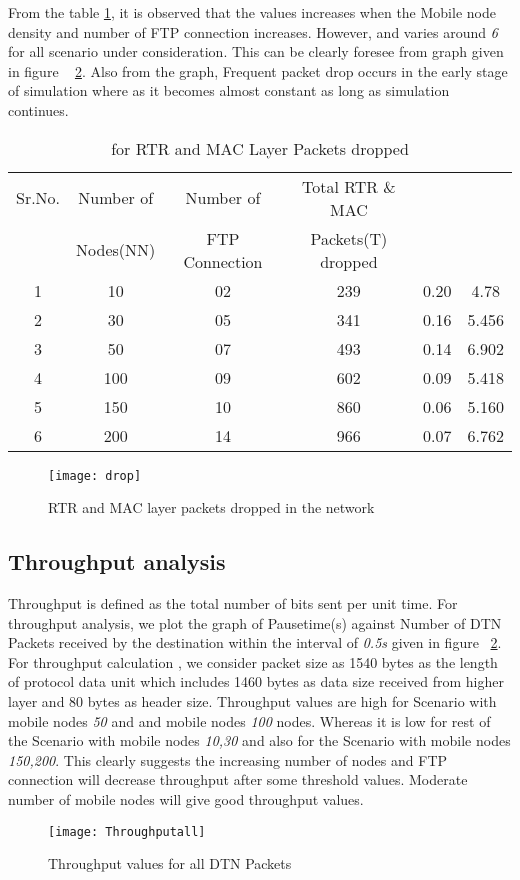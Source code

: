 \documentclass[3p,times]{elsarticle}
\begin{document}
From the table \ref{t16}, it is observed that the  values increases when the Mobile node density and number of FTP connection increases. However, \emph{} and varies around \emph{6} for all scenario under consideration. This can be clearly foresee from graph given in figure ~ \ref{g3}. Also from the graph, Frequent packet drop occurs in the early stage of simulation where as it becomes almost constant as long as simulation continues.
\begin{table}[h]
\centering
\caption{ for RTR and MAC Layer Packets dropped}
\begin{tabular}{|c|c|c|c|c|c|}
\hline
Sr.No. & Number of  & Number of  & Total RTR \& MAC  &  &  \\
 &  Nodes(NN) &  FTP Connection  &  Packets(T) dropped && \\
\hline
1 & 10 & 02 & 239 & 0.20 & 4.78 \\
2 & 30 & 05 & 341 & 0.16 & 5.456\\
3 & 50 & 07 & 493 & 0.14 & 6.902 \\
4 & 100 & 09 & 602 & 0.09 & 5.418 \\
5 & 150 & 10 & 860 & 0.06 & 5.160 \\
6 & 200 & 14 & 966 & 0.07 & 6.762 \\
\hline
\end{tabular}
\label{t16}
\end{table}
   
\begin{figure}[h]
\centering
\mbox{\texttt{[image: drop]}}
\caption{RTR and MAC layer packets dropped in the network}
\label{g2}
\end{figure}
\subsection{Throughput analysis}
Throughput is defined as the total number of bits sent per unit time. For throughput analysis, we plot the graph of Pausetime(s) against Number of DTN Packets received by the destination within the interval of \emph{0.5s} given in figure ~\ref {g3}. For throughput calculation , we consider packet size as 1540 bytes as the length of protocol data unit which includes 1460 bytes as data size received from higher layer and 80 bytes as header size. Throughput values are high for Scenario with mobile nodes \emph{50} and and mobile nodes \emph{100} nodes. Whereas it is low for rest of the Scenario with mobile nodes \emph{10,30} and also for the Scenario with mobile nodes \emph{150,200}. This clearly suggests the increasing number of nodes and FTP connection will decrease throughput after some threshold values. Moderate number of mobile nodes will give good throughput values.                  
\begin{figure}[h]
\centering
\mbox{\texttt{[image: Throughputall]}}
\caption{Throughput values for all DTN Packets}
\label{g3}
\end{figure}
\end{document}
